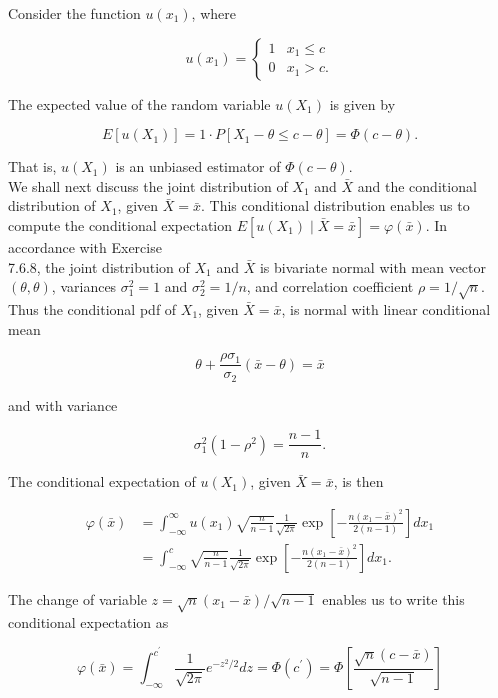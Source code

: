 Consider the function $u\left(x_{1}\right)$, where

$$
u\left(x_{1}\right)= \begin{cases}1 & x_{1} \leq c \\ 0 & x_{1}>c .\end{cases}
$$

The expected value of the random variable $u\left(X_{1}\right)$ is given by

$$
E\left[u\left(X_{1}\right)\right]=1 \cdot P\left[X_{1}-\theta \leq c-\theta\right]=\Phi(c-\theta) .
$$

That is, $u\left(X_{1}\right)$ is an unbiased estimator of $\Phi(c-\theta)$.\\
We shall next discuss the joint distribution of $X_{1}$ and $\bar{X}$ and the conditional distribution of $X_{1}$, given $\bar{X}=\bar{x}$. This conditional distribution enables us to compute the conditional expectation $E\left[u\left(X_{1}\right) \mid \bar{X}=\bar{x}\right]=\varphi(\bar{x})$. In accordance with Exercise\\
7.6.8, the joint distribution of $X_{1}$ and $\bar{X}$ is bivariate normal with mean vector $(\theta, \theta)$, variances $\sigma_{1}^{2}=1$ and $\sigma_{2}^{2}=1 / n$, and correlation coefficient $\rho=1 / \sqrt{n}$. Thus the conditional pdf of $X_{1}$, given $\bar{X}=\bar{x}$, is normal with linear conditional mean

$$
\theta+\frac{\rho \sigma_{1}}{\sigma_{2}}(\bar{x}-\theta)=\bar{x}
$$

and with variance

$$
\sigma_{1}^{2}\left(1-\rho^{2}\right)=\frac{n-1}{n} .
$$

The conditional expectation of $u\left(X_{1}\right)$, given $\bar{X}=\bar{x}$, is then

$$
\begin{aligned}
\varphi(\bar{x}) & =\int_{-\infty}^{\infty} u\left(x_{1}\right) \sqrt{\frac{n}{n-1}} \frac{1}{\sqrt{2 \pi}} \exp \left[-\frac{n\left(x_{1}-\bar{x}\right)^{2}}{2(n-1)}\right] d x_{1} \\
& =\int_{-\infty}^{c} \sqrt{\frac{n}{n-1}} \frac{1}{\sqrt{2 \pi}} \exp \left[-\frac{n\left(x_{1}-\bar{x}\right)^{2}}{2(n-1)}\right] d x_{1} .
\end{aligned}
$$

The change of variable $z=\sqrt{n}\left(x_{1}-\bar{x}\right) / \sqrt{n-1}$ enables us to write this conditional expectation as

$$
\varphi(\bar{x})=\int_{-\infty}^{c^{\prime}} \frac{1}{\sqrt{2 \pi}} e^{-z^{2} / 2} d z=\Phi\left(c^{\prime}\right)=\Phi\left[\frac{\sqrt{n}(c-\bar{x})}{\sqrt{n-1}}\right]
$$

